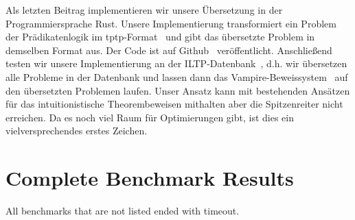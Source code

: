 \documentclass[a4paper,11pt]{report}
\theoremstyle{definition}
\theoremstyle{definition}
\theoremstyle{definition}
\theoremstyle{definition}
\theoremstyle{definition}
\theoremstyle{definition}
\theoremstyle{definition}
\begin{document}
	Als letzten Beitrag implementieren wir unsere Übersetzung in der Programmiersprache Rust. Unsere Implementierung transformiert ein Problem der Prädikatenlogik im tptp-Format~\cite{tptp} und gibt das übersetzte Problem in demselben Format aus. Der Code ist auf Github~\cite{implementation} veröffentlicht. Anschließend testen wir unsere Implementierung an der ILTP-Datenbank~\cite{iltp}, d.h. wir übersetzen alle Probleme in der Datenbank und lassen dann das Vampire-Beweissystem~\cite{Kov_cs_2013} auf den übersetzten Problemen laufen. Unser Ansatz kann mit bestehenden Ansätzen für das intuitionistische Theorembeweisen mithalten aber die Spitzenreiter nicht erreichen. Da es noch viel Raum für Optimierungen gibt, ist dies ein vielversprechendes erstes Zeichen.
	
	
	
	\chapter{Complete Benchmark Results}\label{benchmark-results}
	\singlespacing
	All benchmarks that are not listed ended with timeout.\\
	
\end{document}
